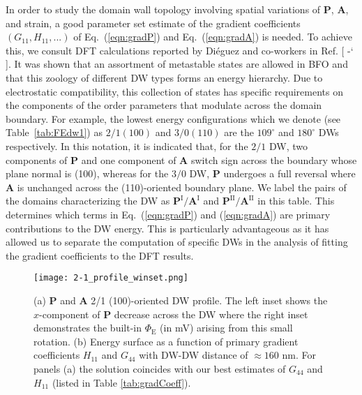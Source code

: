 \documentclass[%
 reprint,
superscriptaddress,
 amsmath,amssymb,
prb,
]{revtex4-1}
\newcommand*{\citen}[1]{%
  \begingroup
    \romannumeral-`\x %
    \setcitestyle{numbers}%
    \cite{#1}%
  \endgroup   
}
\begin{document}
%
In order to study the domain wall topology involving spatial variations of $\mathbf{P}$, $\mathbf{A}$, and strain, a good parameter set estimate of the gradient coefficients $(G_{11}, H_{11}, ...)$ of Eq.~(\ref{eqn:gradP}) and Eq.~(\ref{eqn:gradA}) is needed.
%
To achieve this, we consult DFT calculations reported by Di\'{e}guez and co-workers in Ref. [\citen{Dieguez2013}].
%
It was shown that an assortment of metastable states are allowed in BFO and that this zoology of different DW types forms an energy hierarchy. 
Due to electrostatic compatibility, this collection of states has specific requirements on the components of the order parameters that modulate across the domain boundary.
%
For example, the lowest energy configurations which we denote (see Table~\ref{tab:FEdw1}) as $2/1 (100)$ and $3/0 (110)$ are the $109^\circ$ and $180^\circ$ DWs respectively.
%
In this notation, it is indicated that, for the $2/1$ DW, two components of $\mathbf{P}$ and one component of $\mathbf{A}$ switch sign across the boundary whose plane normal is (100), whereas for the $3/0$ DW, $\mathbf{P}$ undergoes a full reversal where $\mathbf{A}$ is unchanged across the (110)-oriented boundary plane.
%
We label the pairs of the domains characterizing the DW as $\mathbf{P}^\mathrm{I}/\mathbf{A}^\mathrm{I}$ and $\mathbf{P}^\mathrm{II}/\mathbf{A}^\mathrm{II}$ in this table.
%
This determines which terms in Eq.~(\ref{eqn:gradP}) and (\ref{eqn:gradA}) are primary contributions to the DW energy.
%
This is particularly advantageous as it has allowed us to separate the computation of specific DWs in the analysis of fitting the gradient coefficients to the DFT results.
%

\begin{figure}\centering
\hspace*{-5pt}\texttt{[image: 2-1\_profile\_winset.png]}%
\caption{\label{fig:21wall} (a) $\mathbf{P}$ and $\mathbf{A}$ 2/1 (100)-oriented DW profile. 
The left inset shows the $x$-component of $\mathbf{P}$ decrease across the DW where the right inset demonstrates the built-in $\Phi_\mathrm{E}$ (in mV) arising from this small rotation. (b) Energy surface as a function of primary gradient coefficients $H_{11}$ and $G_{44}$ with DW-DW distance of $\approx 160$ nm. For panels (a) the solution coincides with our best estimates of $G_{44}$ and $H_{11}$ (listed in Table \ref{tab:gradCoeff}).}
\end{figure}
\end{document}
